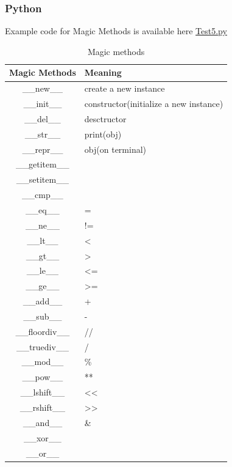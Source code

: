 \documentclass[12pt, a4paper]{report}
\begin{document}
		\subsubsection{Python}
		Example code for Magic Methods is available here \href{https://github.com/muerbingsha/compsumm/blob/master/learn/python/Test5.py}{Test5.py}
		\begin{table}[H]
		\centering
		\begin{tabular}{|c|l|}
		\toprule
		Magic Methods & Meaning \\
		\toprule
		\_\_new\_\_ & create a new instance \\
		\_\_init\_\_ & constructor(initialize a new instance)  \\
		\_\_del\_\_ & desctructor \\
		\hline
		\_\_str\_\_ & print(obj) \\
		\_\_repr\_\_ & obj(on terminal) \\
		\hline
		\_\_getitem\_\_ & \\
		\_\_setitem\_\_ & \\
		\hline
		\_\_cmp\_\_ & \\
		\_\_eq\_\_ & = \\
		\_\_ne\_\_ & != \\
		\_\_lt\_\_ & < \\
		\_\_gt\_\_ & > \\
		\_\_le\_\_ & <= \\
		\_\_ge\_\_ & >= \\
		\hline
		\_\_add\_\_ & + \\
		\_\_sub\_\_ & - \\
		\_\_floordiv\_\_ & // \\
		\_\_truediv\_\_ & / \\
		\_\_mod\_\_ & \% \\
		\_\_pow\_\_ & ** \\
		\_\_lshift\_\_ & << \\
		\_\_rshift\_\_ & >> \\
		\_\_and\_\_  & \& \\
		\_\_xor\_\_ & \\
		\_\_or\_\_ & \\
		\bottomrule
		\end{tabular}
		\caption{Magic methods}
		\end{table}
		
\end{document}
